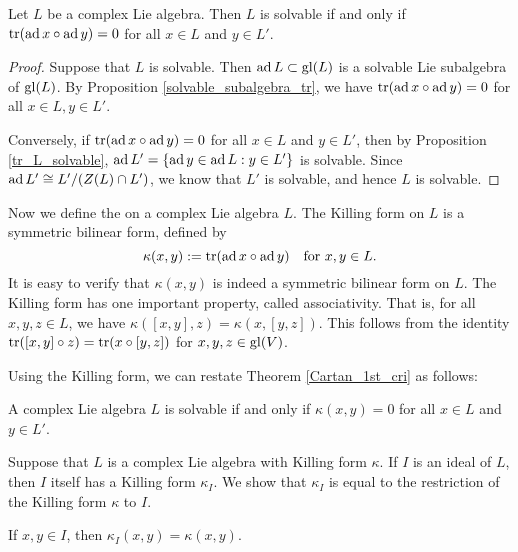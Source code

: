 \begin{thm}\label{Cartan_1st_cri}
    Let $L$ be a complex Lie algebra. Then $L$ is solvable if and only if $\operatorname{tr}(\operatorname{ad} x \circ \operatorname{ad} y)=0$ for all $x\in L$ and $y\in L'$.
\end{thm}

\begin{proof}
    Suppose that $L$ is solvable. Then $\operatorname{ad} L\subset \mathrm{gl}(L)$ is a solvable Lie subalgebra of $\mathrm{gl}(L)$. By Proposition \ref{solvable_subalgebra_tr}, we have $\operatorname{tr}(\operatorname{ad} x \circ \operatorname{ad} y)=0$ for all $x\in L,y\in L'$. 

    Conversely, if $\operatorname{tr}(\operatorname{ad} x \circ \operatorname{ad} y)=0$ for all $x\in L$ and $y\in L'$, then by Proposition \ref{tr_L_solvable}, $\operatorname{ad} L'=\{\operatorname{ad} y\in\operatorname{ad} L:y\in L'\}$ is solvable. Since $\operatorname{ad} L'\cong L'/(Z(L)\cap L')$, we know that $L'$ is solvable, and hence $L$ is solvable.
\end{proof}

Now we define the  on a complex Lie algebra $L$. The Killing form on $L$ is a symmetric bilinear form, defined by 
\[
    \kappa(x,y):=\operatorname{tr}(\operatorname{ad} x\circ \operatorname{ad} y)\quad \mbox{for }x,y\in L.
\]
It is easy to verify that $\kappa(x,y)$ is indeed a symmetric bilinear form on $L$. The Killing form has one important property, called associativity. That is, for all $x,y,z\in L$, we have $\kappa([x,y],z)=\kappa(x,[y,z])$. This follows from the identity $\operatorname{tr}([x,y]\circ z)=\operatorname{tr}(x\circ [y,z])$ for $x,y,z\in\mathrm{gl}(V)$.

Using the Killing form, we can restate Theorem \ref{Cartan_1st_cri} as follows:
\begin{thm}
    A complex Lie algebra $L$ is solvable if and only if $\kappa(x,y)=0$ for all $x\in L$ and $y\in L'$.
\end{thm}

Suppose that $L$ is a complex Lie algebra with Killing form $\kappa$. If $I$ is an ideal of $L$, then $I$ itself has a Killing form $\kappa_I$. We show that $\kappa_I$ is equal to the restriction of the Killing form $\kappa$ to $I$.

\begin{lem}
    If $x,y\in I$, then $\kappa_I(x,y)=\kappa(x,y)$.
\end{lem}

